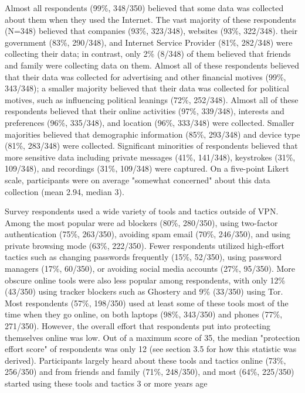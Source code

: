 Almost all respondents (99\%, 348/350) believed that some data was collected
about them when they used the Internet. The vast majority of these respondents
(N=348) believed that companies (93\%, 323/348), websites (93\%, 322/348).
their government (83\%, 290/348), and Internet Service Provider (81\%,
282/348) were collecting their data; in contrast, only 2\% (8/348) of them
believed that friends and family were collecting data on them. Almost all of
these respondents believed that their data was collected for advertising and
other financial motives (99\%, 343/348); a smaller majority believed that
their data was collected for political motives, such as influencing political
leanings (72\%, 252/348). Almost all of these respondents believed that their
online activities (97\%, 339/348), interests and preferences (96\%, 335/348),
and location (96\%, 333/348) were collected. Smaller majorities believed that
demographic information (85\%, 293/348) and device type (81\%, 283/348) were
collected. Significant minorities of respondents believed that more sensitive
data including private messages (41\%, 141/348), keystrokes (31\%, 109/348),
and recordings (31\%, 109/348) were captured. On a five-point Likert scale,
participants were on average "somewhat concerned" about this data collection
(mean 2.94, median 3).

Survey respondents used a wide variety of tools and tactics outside of VPN.
Among the most popular were ad blockers (80\%, 280/350), using two-factor
authentication (75\%, 263/350), avoiding spam email (70\%, 246/350), and using
private browsing mode (63\%, 222/350). Fewer respondents utilized high-effort
tactics such as changing passwords frequently (15\%, 52/350), using password
managers (17\%, 60/350), or avoiding social media accounts (27\%, 95/350).
More obscure online tools were also less popular among respondents, with only
12\% (43/350) using tracker blockers such as Ghostery and 9\% (33/350) using
Tor. Most respondents (57\%, 198/350) used at least some of these tools most
of the time when they go online, on both laptops (98\%, 343/350) and phones
(77\%, 271/350). However, the overall effort that respondents put into
protecting themselves online was low. Out of a maximum score of 35, the median
"protection effort score" of respondents was only 12 (see section 3.5 for how
this statistic was derived). Participants largely heard about these tools and
tactics online (73\%, 256/350) and from friends and family (71\%, 248/350),
and most (64\%, 225/350) started using these tools and tactics 3 or more years
age



